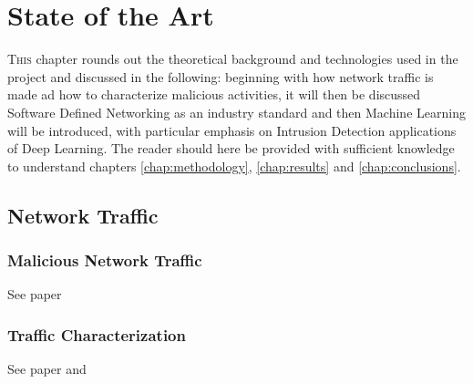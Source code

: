 \chapter{State of the Art}
\label{chap:state-of-the-art}

\lettrine[lines=3, findent=3pt, nindent=0pt]{T}{his} chapter rounds out the theoretical background and technologies used in the project and discussed in the following: beginning with how network traffic is made ad how to characterize malicious activities, it will then be discussed Software Defined Networking as an industry standard and then Machine Learning will be introduced, with particular emphasis on Intrusion Detection applications of Deep Learning. The reader should here be provided with sufficient knowledge to understand chapters \ref{chap:methodology}, \ref{chap:results} and \ref{chap:conclusions}.


\section{Network Traffic}
\label{sec:network-traffic}

\lipsum


\subsection{Malicious Network Traffic}
\label{subsec:malicious-traffic}

See paper \cite{icissp18} \\

\lipsum


\subsection{Traffic Characterization}
\label{subsec:traffic-characterization}

See paper \cite{Iglesias2015} and  \cite{Velan2016} \\

\lipsum

